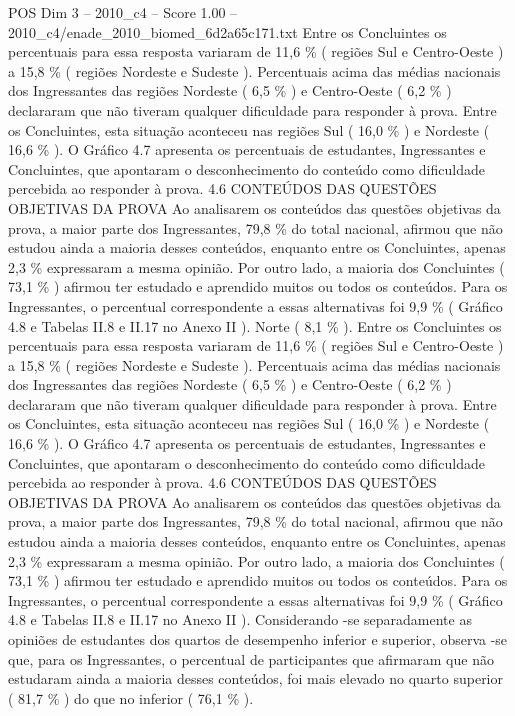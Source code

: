 \begin{textsample}{POS Dim 3 – 2010\_c4 – Score 1.00 – 2010\_c4/enade\_2010\_biomed\_6d2a65c171.txt}
Entre os Concluintes os percentuais para essa resposta variaram de 11,6 \% ( regiões Sul e Centro-Oeste ) a 15,8 \% ( regiões Nordeste e Sudeste ).
Percentuais acima das médias nacionais dos Ingressantes das regiões Nordeste ( 6,5 \% ) e Centro-Oeste ( 6,2 \% ) declararam que não tiveram qualquer dificuldade para responder à prova.
Entre os Concluintes, esta situação aconteceu nas regiões Sul ( 16,0 \% ) e Nordeste ( 16,6 \% ).
O Gráfico 4.7 apresenta os percentuais de estudantes, Ingressantes e Concluintes, que apontaram o desconhecimento do conteúdo como dificuldade percebida ao responder à prova. 4.6 CONTEÚDOS DAS QUESTÕES OBJETIVAS DA PROVA Ao analisarem os conteúdos das questões objetivas da prova, a maior parte dos Ingressantes, 79,8 \% do total nacional, afirmou que não estudou ainda a maioria desses conteúdos, enquanto entre os Concluintes, apenas 2,3 \% expressaram a mesma opinião.
Por outro lado, a maioria dos Concluintes ( 73,1 \% ) afirmou ter estudado e aprendido muitos ou todos os conteúdos.
Para os Ingressantes, o percentual correspondente a essas alternativas foi 9,9 \% ( Gráfico 4.8 e Tabelas II.8 e II.17 no Anexo II ).
Norte ( 8,1 \% ).
Entre os Concluintes os percentuais para essa resposta variaram de 11,6 \% ( regiões Sul e Centro-Oeste ) a 15,8 \% ( regiões Nordeste e Sudeste ).
Percentuais acima das médias nacionais dos Ingressantes das regiões Nordeste ( 6,5 \% ) e Centro-Oeste ( 6,2 \% ) declararam que não tiveram qualquer dificuldade para responder à prova.
Entre os Concluintes, esta situação aconteceu nas regiões Sul ( 16,0 \% ) e Nordeste ( 16,6 \% ).
O Gráfico 4.7 apresenta os percentuais de estudantes, Ingressantes e Concluintes, que apontaram o desconhecimento do conteúdo como dificuldade percebida ao responder à prova. 4.6 CONTEÚDOS DAS QUESTÕES OBJETIVAS DA PROVA Ao analisarem os conteúdos das questões objetivas da prova, a maior parte dos Ingressantes, 79,8 \% do total nacional, afirmou que não estudou ainda a maioria desses conteúdos, enquanto entre os Concluintes, apenas 2,3 \% expressaram a mesma opinião.
Por outro lado, a maioria dos Concluintes ( 73,1 \% ) afirmou ter estudado e aprendido muitos ou todos os conteúdos.
Para os Ingressantes, o percentual correspondente a essas alternativas foi 9,9 \% ( Gráfico 4.8 e Tabelas II.8 e II.17 no Anexo II ).
Considerando -se separadamente as opiniões de estudantes dos quartos de desempenho inferior e superior, observa -se que, para os Ingressantes, o percentual de participantes que afirmaram que não estudaram ainda a maioria desses conteúdos, foi mais elevado no quarto superior ( 81,7 \% ) do que no inferior ( 76,1 \% ).

\end{textsample}
